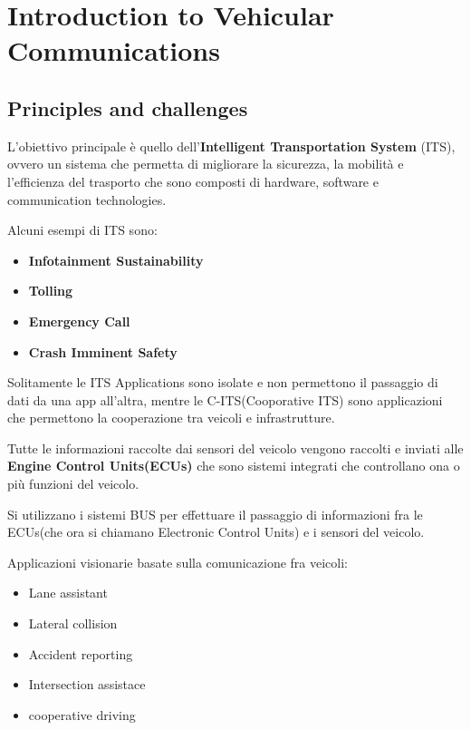 \chapter{Introduction to Vehicular Communications}
\section{Principles and challenges}

L'obiettivo principale è quello dell'\textbf{Intelligent Transportation System} (ITS), ovvero un sistema che permetta di migliorare la sicurezza, la mobilità e l'efficienza del trasporto che sono composti di hardware, software e communication technologies.

Alcuni esempi di ITS sono:
\begin{itemize}
  \item \textbf{Infotainment Sustainability}
  \item \textbf{Tolling}
  \item \textbf{Emergency Call}
  \item \textbf{Crash Imminent Safety}
\end{itemize}

Solitamente le ITS Applications sono isolate e non permettono il passaggio di dati da una app all'altra, mentre le C-ITS(Cooporative ITS) sono applicazioni che permettono la cooperazione tra veicoli e infrastrutture.

Tutte le informazioni raccolte dai sensori del veicolo vengono raccolti e inviati alle \textbf{Engine Control Units(ECUs)} che sono sistemi integrati che controllano ona o più funzioni del veicolo.


Si utilizzano i sistemi BUS per effettuare il passaggio di informazioni fra le ECUs(che ora si chiamano Electronic Control Units) e i sensori del veicolo.

Applicazioni visionarie basate sulla comunicazione fra veicoli:
\begin{itemize}
  \item Lane assistant
  \item Lateral collision
  \item Accident reporting
  \item Intersection assistace
  \item cooperative driving
\end{itemize}



